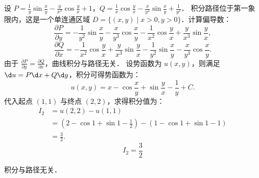 \begin{solution}
    设 $P = \frac{1}{y} \sin \frac{x}{y} - \frac{y}{x^2} \cos \frac{y}{x} + 1$，$Q = \frac{1}{x} \cos \frac{y}{x} - \frac{x}{y^2} \sin \frac{x}{y} + \frac{1}{y^2}$．
    积分路径位于第一象限内，这是一个单连通区域 $D = \{(x,y) \mid x > 0, y > 0\}$．计算偏导数：
    \begin{equation}
        \label{eq:deriv-check-2a}
        \frac{\partial P}{\partial y} = -\frac{1}{y^2} \sin \frac{x}{y} - \frac{x}{y^3} \cos \frac{x}{y} - \frac{1}{x^2} \cos \frac{y}{x} + \frac{y}{x^3} \sin \frac{y}{x},
    \end{equation}
    \begin{equation}
        \label{eq:deriv-check-2b}
        \frac{\partial Q}{\partial x} = -\frac{1}{x^2} \cos \frac{y}{x} + \frac{y}{x^3} \sin \frac{y}{x} - \frac{1}{y^2} \sin \frac{x}{y} - \frac{x}{y^3} \cos \frac{x}{y}.
    \end{equation}
    由于 $\frac{\partial P}{\partial y} = \frac{\partial Q}{\partial x}$，曲线积分与路径无关．
    设势函数为 $u(x, y)$，则满足 $\d u = P \d x + Q \d y$，积分可得势函数为：
    \begin{equation}
        u(x, y) = x - \cos \frac{x}{y} + \sin \frac{y}{x} - \frac{1}{y} + C.
    \end{equation}
    代入起点 $(1,1)$ 与终点 $(2,2)$，求得积分值为：
    \begin{equation}
        \begin{aligned}
            I_2 & = u(2,2) - u(1,1)                                                                           \\
                & = \left( 2 - \cos 1 + \sin 1 - \frac{1}{2} \right) - \left( 1 - \cos 1 + \sin 1 - 1 \right) \\
                & = \frac{3}{2}.
        \end{aligned}
    \end{equation}
    \begin{equation}
        I_2 = \boxed{\frac{3}{2}}
    \end{equation}

     积分与路径无关．


\end{solution}
